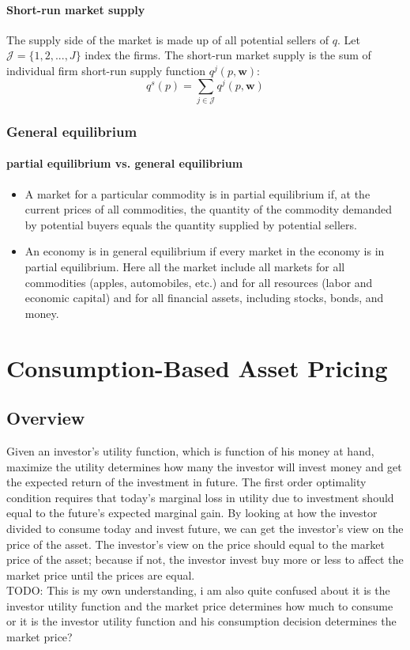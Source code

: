 \documentclass[a4paper,13pt]{report}
\begin{document}
\subsubsection{Short-run market supply}
The supply side of the market is made up of all potential sellers of $q$. Let $\mathcal{J}=\{1,2,...,J\}$ index the firms. The short-run market supply is the sum of individual firm short-run supply function $q^j(p,\bm{w})$:
$$q^s(p)=\sum_{j\in \mathcal{J}} q^j(p,\bm{w})$$



\subsection{General equilibrium}
\subsubsection{partial equilibrium vs. general equilibrium}
\begin{itemize}
    \item A market for a particular commodity is in partial equilibrium if, at the current prices of all commodities, the quantity of the commodity demanded by potential buyers equals the quantity supplied by potential sellers.
    \item An economy is in general equilibrium if every market in the economy is in partial equilibrium. Here all the market include all markets for all commodities (apples, automobiles, etc.) and for all resources (labor and economic capital) and for all financial assets, including stocks, bonds, and money.
\end{itemize}


\chapter{Consumption-Based Asset Pricing}
\section{Overview\cite{cochrane2009asset}}
Given an investor's utility function, which is function of his money at hand, maximize the utility determines how many the investor will invest money and get the expected return of the investment in future. The first order optimality condition requires that today's marginal loss in utility due to investment should equal to the future's expected marginal gain. By looking at how the investor divided to consume today and invest future, we can get the investor's view on the price of the asset. The investor's view on the price should equal to the market price of the asset; because if not, the investor invest buy more or less to affect the market price until the prices are equal. \\
TODO: This is my own understanding, i am also quite confused about it is the investor utility function and the market price determines how much to consume or it is the investor utility function and his consumption decision determines the market price?
\end{document}
